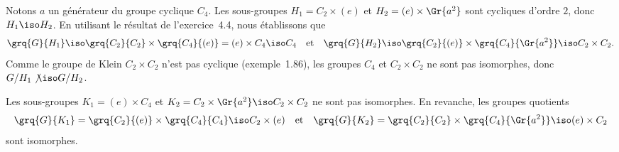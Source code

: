 Notons $a$ un générateur du groupe cyclique $C_4$.
Les sous-groupes $H_1 = C_2\times (e)$ et $H_2 = (e)\times\Gr{a^2}$ sont cycliques d'ordre $2$, donc $H_1\iso H_2$.
En utilisant le résultat de l'exercice~4.4, nous établissons que
\[
  \grq{G}{H_1} \iso \grq{C_2}{C_2}\times\grq{C_4}{(e)} = (e)\times C_4 \iso C_4
  \quad\text{et}\quad
  \grq{G}{H_2} \iso \grq{C_2}{(e)}\times \grq{C_4}{\Gr{a^2}} \iso C_2\times C_2.
\]
Comme le groupe de Klein $C_2\times C_2$ n'est pas cyclique (exemple~1.86), les groupes $C_4$ et $C_2\times C_2$ ne sont pas isomorphes, donc $G/H_1\not\iso G/H_2$.

Les sous-groupes $K_1 = (e)\times C_4$ et $K_2 = C_2\times\Gr{a^2} \iso C_2\times C_2$ ne sont pas isomorphes.
En revanche, les groupes quotients
\[
  \grq{G}{K_1} = \grq{C_2}{(e)}\times\grq{C_4}{C_4} \iso C_2\times (e)
  \quad\text{et}\quad
  \grq{G}{K_2} = \grq{C_2}{C_2}\times\grq{C_4}{\Gr{a^2}} \iso (e)\times C_2
\]
sont isomorphes.
